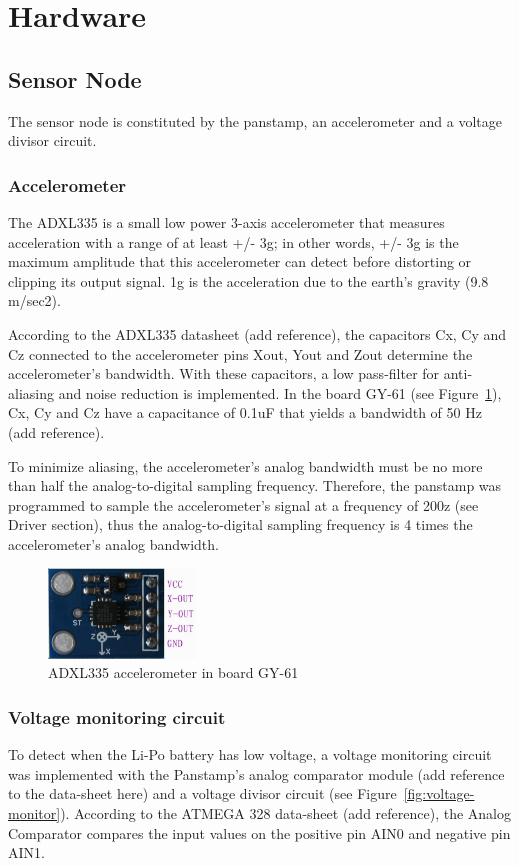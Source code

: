 \section{Hardware}
\subsection{Sensor Node}
The sensor node is constituted by the panstamp, an accelerometer and a voltage divisor circuit.
\subsubsection{Accelerometer}
The ADXL335 is a small low power 3-axis accelerometer that measures acceleration with a range of at least +/- 3g; in other words, +/- 3g is the maximum amplitude that this accelerometer can detect before distorting or clipping its output signal. 1g is the acceleration due to the earth's gravity (9.8 m/sec2).

According to the ADXL335 datasheet (add reference), the capacitors Cx, Cy and Cz connected to the accelerometer pins Xout, Yout and Zout determine the accelerometer's bandwidth. With these capacitors, a low pass-filter for anti-aliasing and noise reduction is implemented. In the board GY-61 (see Figure~\ref{fig:accelerometer}), Cx, Cy and Cz have a capacitance of 0.1uF that yields a bandwidth of 50 Hz (add reference). 	

To minimize aliasing, the accelerometer's analog bandwidth must be no more than half the analog-to-digital sampling frequency. Therefore, the panstamp was programmed to sample the accelerometer's signal at a frequency of 200z (see Driver section), thus the analog-to-digital sampling frequency is 4 times the accelerometer's analog bandwidth. 

\begin{figure}[h!] 
 \centering
 \includegraphics[width= 0.35\textwidth, clip=true,keepaspectratio=true]
 {./pic/accelerometer.png}
 \caption{ADXL335 accelerometer in board GY-61}
 \label{fig:accelerometer}
\end{figure}  
    
  
\subsubsection{Voltage monitoring circuit}
To detect when the Li-Po battery has low voltage, a voltage monitoring circuit was implemented with the Panstamp's analog comparator module (add reference to the data-sheet here) and a voltage divisor circuit (see Figure~\ref{fig:voltage-monitor}). According to the ATMEGA 328 data-sheet (add reference), the Analog Comparator compares the input values on the positive pin AIN0 and negative pin AIN1. 

